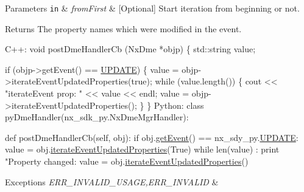 \begin{DoxyParams}[1]{Parameters}
\mbox{\tt in}  & {\em from\+First} & \mbox{[}Optional\mbox{]} Start iteration from beginning or not. \\
\hline
\end{DoxyParams}
\begin{DoxyReturn}{Returns}
The property names which were modified in the event. 
\begin{DoxyCode}
C++:
     \textcolor{keywordtype}{void} postDmeHandlerCb (NxDme *objp)
     \{
        std::string value;

        \textcolor{keywordflow}{if} (objp->getEvent() == \mbox{\hyperlink{nx__common_8h_af9a9040b7681199d386e94eb888018cba4f3a5ababd9a5356d642a492f5ccc371}{UPDATE}}) \{
          value = objp->iterateEventUpdatedProperties(\textcolor{keyword}{true});
          \textcolor{keywordflow}{while} (value.length()) \{
            cout << \textcolor{stringliteral}{"iterateEvent prop: "} << value << endl;
            value = objp->iterateEventUpdatedProperties();
          \}
        \}
Python:
      \textcolor{keyword}{class }pyDmeHandler(nx\_sdk\_py.NxDmeMgrHandler):

        def postDmeHandlerCb(self, obj):
           if obj.\mbox{\hyperlink{classnxos_1_1_nx_dme_aff302a3891e0b6f69e9e0fd26e6e16a7}{getEvent}}() == nx\_sdy\_py.\mbox{\hyperlink{nx__common_8h_af9a9040b7681199d386e94eb888018cba4f3a5ababd9a5356d642a492f5ccc371}{UPDATE}}:
               value = obj.\mbox{\hyperlink{classnxos_1_1_nx_dme_a2fe8b05c2c14f16ad7a2f4002a63baf2}{iterateEventUpdatedProperties}}(True)
               while len(value) :
                  print "Property changed: %
                  value = obj.\mbox{\hyperlink{classnxos_1_1_nx_dme_a2fe8b05c2c14f16ad7a2f4002a63baf2}{iterateEventUpdatedProperties}}()
\end{DoxyCode}

\end{DoxyReturn}

\begin{DoxyExceptions}{Exceptions}
{\em E\+R\+R\+\_\+\+I\+N\+V\+A\+L\+I\+D\+\_\+\+U\+S\+A\+GE,E\+R\+R\+\_\+\+I\+N\+V\+A\+L\+ID} & \\
\hline
\end{DoxyExceptions}
\mbox{\label{classnxos_1_1_nx_dme_abb7ee373c1fe3a50b52a243be2f9a863}} 
